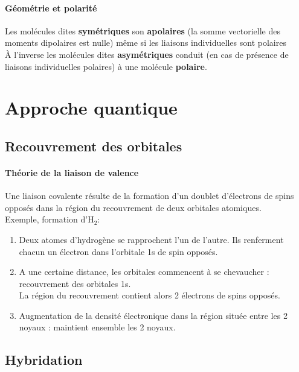 \documentclass[10pt,a4paper]{book}
\begin{document}
\paragraph{Géométrie et polarité} Les molécules dites \textbf{symétriques} son \textbf{apolaires} (la somme vectorielle des moments dipolaires est nulle) même si les liaisons individuelles sont polaires \\
À l'inverse les molécules dites \textbf{asymétriques} conduit (en cas de présence de liaisons individuelles polaires) à une molécule \textbf{polaire}.

\section{Approche quantique}

\subsection{Recouvrement des orbitales}

\paragraph{Théorie de la liaison de valence} Une liaison covalente résulte de la formation d'un doublet d'électrons de spins opposés dans la région du recouvrement de deux orbitales atomiques. \\
Exemple, formation d'H$_2$:
\begin{enumerate}
\item Deux atomes d'hydrogène se rapprochent l'un de l'autre. Ils renferment chacun un électron dans l'orbitale 1s de spin opposés.
\item A une certaine distance, les orbitales commencent à se chevaucher : recouvrement des orbitales 1s. \\
La région du recouvrement contient alors 2 électrons de spins opposés.
\item Augmentation de la densité électronique dans la région située entre les 2 noyaux : maintient ensemble les 2 noyaux.
\end{enumerate}

\subsection{Hybridation}
\end{document}
